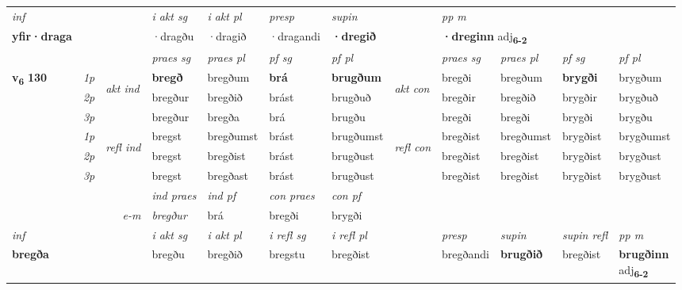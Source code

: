\begin{longtable}[l]{X>{\footnotesize\itshape}llXXXXlXXXX}
   {\textit{inf}} & &  & \textit{i akt sg} & \textit{i akt pl}   & \textit{presp} & \textit{supin}  && \textit{pp m} \\*
  {\textbf{yfir\allowbreak ·draga}} & && ·dragðu  & ·dragið   & ·dragandi &  \textbf{·dregið}  && \multicolumn{2}{l}{\textbf{·dreginn} adj\textbf{\textsubscript{6-2}}} \\*

\midrule

 & &   & \textit{praes sg}  & \textit{praes pl}    & \textit{ pf sg} & \textit{pf pl} & & \textit{praes sg}  & \textit{praes pl}    & \textit{pf sg} & \textit{pf pl }  \\ \cmidrule{4-7} \cmidrule{9-12}
 \multirow{2}{*}{{{\textbf{v{\textsubscript{6}}} \Large{\textbf{130}}}}}  & 1p & \multirow{3}{*}{\begin{turn}{90}\textit{akt ind}\end{turn}} & \textbf{bregð} & bregðum & \textbf{brá} & \textbf{brugðum} & \multirow{3}{*}{\begin{turn}{90}\textit{akt con}\end{turn}} &bregði & bregðum & \textbf{brygði} & brygðum\\*
 & 2p &  &  bregður  & bregðið & brást & brugðuð & & bregðir & bregðið & brygðir & brygðuð \\*
 & 3p &  & bregður & bregða & brá & brugðu & & bregði & bregði& brygði & brygðu \\*
\cmidrule{4-7} \cmidrule{9-12}
 & 1p & \multirow{3}{*}{\begin{turn}{90}\textit{refl ind}\end{turn}}  & bregst & bregðumst & brást & brugðumst & \multirow{3}{*}{\begin{turn}{90}\textit{refl con}\end{turn}}  &bregðist & bregðumst & brygðist & brygðumst \\*
 & 2p &  & bregst & bregðist & brást & brugðust & &bregðist & bregðist & brygðist & brygðust \\*
 & 3p  & & bregst & bregðast & brást & brugðust & & bregðist & bregðist& brygðist & brygðust \\*
\cmidrule{4-7} \cmidrule{9-12}

   && &  \textit{ind praes} & \textit{ind pf} & \textit{con praes} & \textit{con pf} \\*
\multicolumn{3}{r}{\textit{e-m}} & bregður & brá & bregði & brygði \\*

\cmidrule{4-7}
   {\textit{inf}} & &  & \textit{i akt sg} & \textit{i akt pl} & \textit{i refl sg} & \textit{i refl pl} && \textit{presp} & \textit{supin} & \textit{supin refl} & \textit{pp m} \\*
  {\textbf{bregða}} & && bregðu  & bregðið & bregstu & bregðist && bregðandi &  \textbf{brugðið} & bregðist & \specialcell{\textbf{brugðinn} \\ adj\textbf{\textsubscript{6-2}}} \\*


\end{longtable}
